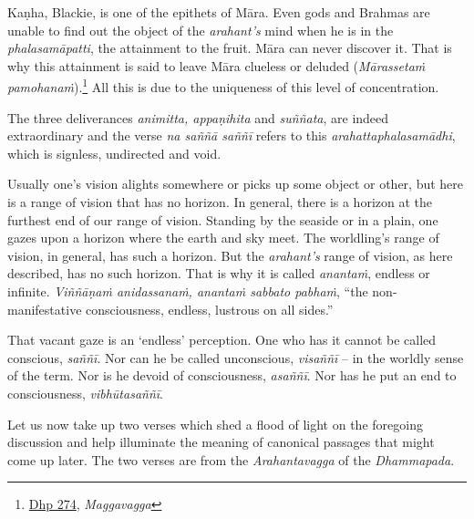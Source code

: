 Kaṇha, Blackie, is one of the epithets of Māra. Even gods and Brahmas are unable to find out the object of the \emph{arahant's} mind when he is in the \emph{phalasamāpatti}, the attainment to the fruit. Māra can never discover it. That is why this attainment is said to leave Māra clueless or deluded (\emph{Mārassetaṁ pamohanaṁ}).\footnote{\href{https://suttacentral.net/dhp273-289/pli/ms}{Dhp 274}, \emph{Maggavagga}} All this is due to the uniqueness of this level of concentration.

The three deliverances \emph{animitta, appaṇihita} and \emph{suññata}, are indeed extraordinary and the verse \emph{na saññā saññī} refers to this \emph{arahattaphalasamādhi}, which is signless, undirected and void.

Usually one's vision alights somewhere or picks up some object or other, but here is a range of vision that has no horizon. In general, there is a horizon at the furthest end of our range of vision. Standing by the seaside or in a plain, one gazes upon a horizon where the earth and sky meet. The worldling's range of vision, in general, has such a horizon. But the \emph{arahant's} range of vision, as here described, has no such horizon. That is why it is called \emph{anantaṁ}, endless or infinite. \emph{Viññāṇaṁ anidassanaṁ, anantaṁ sabbato pabhaṁ}, ``the non-manifestative consciousness, endless, lustrous on all sides.''

That vacant gaze is an `endless' perception. One who has it cannot be called conscious, \emph{saññī}. Nor can he be called unconscious, \emph{visaññī} -- in the worldly sense of the term. Nor is he devoid of consciousness, \emph{asaññī}. Nor has he put an end to consciousness, \emph{vibhūtasaññī}.

Let us now take up two verses which shed a flood of light on the foregoing discussion and help illuminate the meaning of canonical passages that might come up later. The two verses are from the \emph{Arahantavagga} of the \emph{Dhammapada}.

\clearpage


